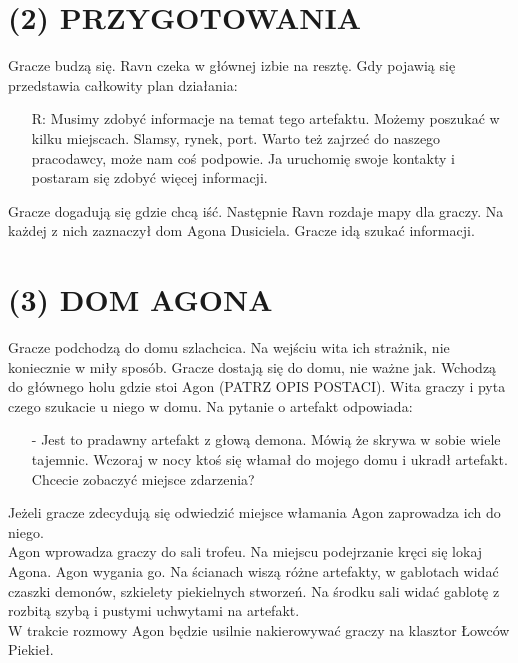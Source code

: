 \documentclass[14pt]{article}
\begin{document}
\Centering
\section*{(2) PRZYGOTOWANIA}
\RaggedRight
Gracze budzą się. Ravn czeka w głównej izbie na resztę. Gdy pojawią się przedstawia całkowity plan działania:
\begin{itemize}
    \item[R:] Musimy zdobyć informacje na temat tego artefaktu. Możemy poszukać w kilku miejscach. Slamsy, rynek, port. Warto też zajrzeć do naszego pracodawcy, może nam coś podpowie. Ja uruchomię swoje kontakty i postaram się zdobyć więcej informacji.
\end{itemize}
Gracze dogadują się gdzie chcą iść. Następnie Ravn rozdaje mapy dla graczy. Na każdej z nich zaznaczył dom Agona Dusiciela. Gracze idą szukać informacji.

\Centering
\section*{(3) DOM AGONA}
\RaggedRight
Gracze podchodzą do domu szlachcica. Na wejściu wita ich strażnik, nie koniecznie w miły sposób. Gracze dostają się do domu, nie ważne jak. Wchodzą do głównego holu gdzie stoi Agon (PATRZ OPIS POSTACI). Wita graczy i pyta czego szukacie u niego w domu. Na pytanie o artefakt odpowiada:
\begin{itemize}
    \item[-] Jest to pradawny artefakt z głową demona. Mówią że skrywa w sobie wiele tajemnic. Wczoraj w nocy ktoś się włamał do mojego domu i ukradł artefakt. Chcecie zobaczyć miejsce zdarzenia?
\end{itemize}
Jeżeli gracze zdecydują się odwiedzić miejsce włamania Agon zaprowadza ich do niego. \\
\vspace{5mm}
Agon wprowadza graczy do sali trofeu. Na miejscu podejrzanie kręci się lokaj Agona. Agon wygania go. Na ścianach wiszą różne artefakty, w gablotach widać czaszki demonów, szkielety piekielnych stworzeń. Na środku sali widać gablotę z rozbitą szybą i pustymi uchwytami na artefakt. \\
\vspace{5mm}
W trakcie rozmowy Agon będzie usilnie nakierowywać graczy na klasztor Łowców Piekieł.
\newpage

\Centering
\end{document}
